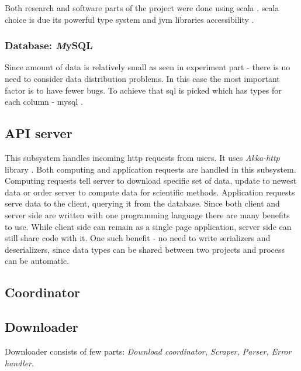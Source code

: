 \documentclass[a4paper,12pt]{article}
\begin{document}
    Both research and software parts of the project were done using \gls{scala} \cite{scala_lang}. \Gls{scala} choice is due its powerful type system and \gls{jvm} libraries accessibility \cite{scala_in_depth}. 
    
    \subsubsection{Database: {\textit MySQL}}
    
  	Since amount of data is relatively small as seen in experiment part - there is no need to consider data distribution problems. In this case the most important factor is to have fewer bugs. To achieve that \acrfull{sql} is picked which has types for each column - \gls{mysql} \cite{mysql_lang}.
    
	\subsection{API server}
	
	This subsystem handles incoming \gls{http} requests from users. It uses \textit{Akka-http} library \cite{akka_http}. Both computing and application requests are handled in this subsystem. Computing requests tell server to download specific set of data, update to newest data or order server to compute data for scientific methods. Application requests serve data to the client, querying it from the database. Since both client and server side are written with one programming language there are many benefits to use. While client side can remain as a single page application, server side can still share code with it. One such benefit - no need to write serializers and deserializers, since data types can be shared between two projects and process can be automatic. 
	
	\subsection{Coordinator}
        
    \subsection{Downloader}
    
    Downloader consists of few parts: \textit{Download coordinator, Scraper, Parser, Error handler}. 
    
 
    \clearpage
    
\end{document}

